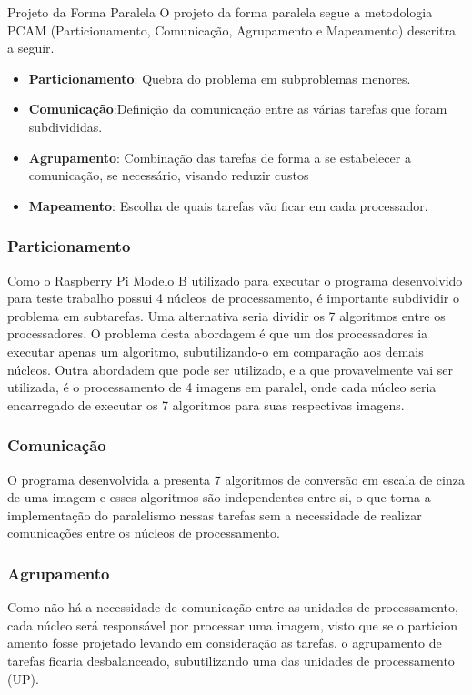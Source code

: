 \begin{subsection}{Projeto da Forma Paralela}
O projeto da forma paralela segue a metodologia PCAM (Particionamento,
Comunicação, Agrupamento e Mapeamento) descritra a seguir.

\begin{itemize}
\item \textbf{Particionamento}: Quebra do problema em subproblemas menores.
\item \textbf{Comunicação}:Definição da comunicação entre as várias tarefas que
foram subdivididas.
\item \textbf{Agrupamento}: Combinação das tarefas de forma a se estabelecer a
comunicação, se necessário, visando reduzir custos
\item \textbf{Mapeamento}: Escolha de quais tarefas vão ficar em cada processador.

\end{itemize}

\subsubsection{Particionamento}
Como o Raspberry Pi Modelo B utilizado para executar o programa desenvolvido
para teste trabalho possui 4 núcleos de processamento, é importante subdividir o
problema em subtarefas. Uma alternativa seria dividir os 7 algoritmos entre os
processadores. O problema desta abordagem é que um dos processadores ia executar
apenas um algoritmo, subutilizando-o em comparação aos demais núcleos. Outra
abordadem que pode ser utilizado, e a que provavelmente vai ser utilizada, é o
processamento de 4 imagens em paralel, onde cada núcleo seria encarregado de
executar os 7 algoritmos para suas respectivas imagens.

\subsubsection{Comunicação}

O programa desenvolvida a presenta 7 algoritmos de conversão em escala de cinza
de uma imagem e esses algoritmos são independentes entre si, o que torna a
implementação do paralelismo nessas tarefas sem a necessidade de realizar
comunicações entre os núcleos de processamento.

\subsubsection{Agrupamento}
Como não há a necessidade de comunicação entre as unidades de processamento,
cada núcleo será responsável por processar uma imagem, visto que se o particion
amento fosse projetado levando em consideração as tarefas, o agrupamento de
tarefas ficaria desbalanceado, subutilizando uma das unidades de processamento
(UP).


\end{subsection}
